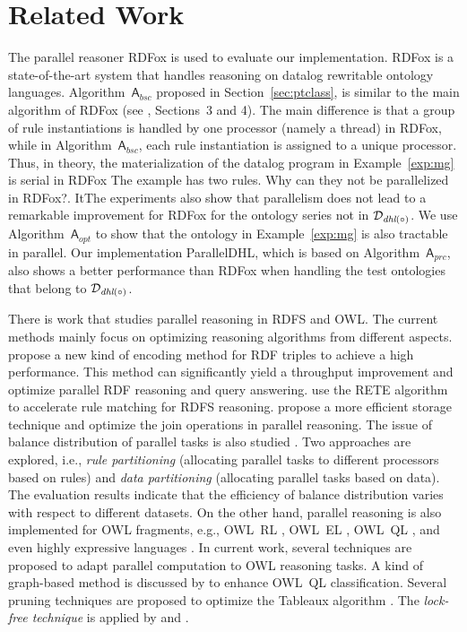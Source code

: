 \section{Related Work}
\label{sec:related}

The parallel reasoner RDFox \cite{MotikNPHO14} is used to evaluate our implementation. RDFox is a state-of-the-art system that handles reasoning on datalog rewritable ontology languages. Algorithm~$\mathsf{A}_{bsc}$ proposed in Section~\ref{sec:ptclass}, is similar to the main algorithm of RDFox (see \cite{MotikNPHO14}, Sections~3 and 4). The main difference is that a group of rule instantiations is handled by one processor (namely a thread) in RDFox, while in Algorithm~$\mathsf{A}_{bsc}$, each rule instantiation is assigned to a unique processor. Thus, in theory, the materialization of the datalog program in Example~\ref{exp:mg} is serial in RDFox {\color{red}The example has two rules. Why can they not be parallelized in RDFox?}. ItThe experiments also show that parallelism does not lead to a remarkable improvement for RDFox for the ontology series not in $\mathcal{D}_{\textit{\text{dhl}}(\circ)}$. We use Algorithm~$\mathsf{A}_{opt}$ to show that the ontology in Example~\ref{exp:mg} is also tractable in parallel. Our implementation ParallelDHL, which is based on Algorithm~$\mathsf{A}_{prc}$, also shows a better performance than RDFox when handling the test ontologies that belong to $\mathcal{D}_{\textit{\text{dhl}}(\circ)}$.

There is work that studies parallel reasoning in RDFS and OWL. The current methods mainly focus on optimizing reasoning algorithms from different aspects. \citet{GoodmanJMAAH11} propose a new kind of encoding method for RDF triples to achieve a high performance. This method can significantly yield a throughput improvement and optimize parallel RDF reasoning and query answering. \citet{PetersSZ15} use the RETE algorithm to accelerate rule matching for RDFS reasoning. \citet{SubercazeGCL16} propose a more efficient storage technique and optimize the join operations in parallel reasoning. The issue of balance distribution of parallel tasks is also studied \cite{SomaP08,WeaverH09}. Two approaches are explored, i.e., \emph{rule partitioning} (allocating parallel tasks to different processors based on rules) and \emph{data partitioning} (allocating parallel tasks based on data). The evaluation results indicate that the efficiency of balance distribution varies with respect to different datasets. On the other hand, parallel reasoning is also implemented for OWL fragments, e.g., OWL~RL \cite{KolovskiWE10}, OWL~EL \cite{KazakovKS14}, OWL~QL \cite{LemboSS13}, and even highly expressive languages \cite{SteigmillerLG14,LiebigM07,SchlichtS08,WuH12}. In current work, several techniques are proposed to adapt parallel computation to OWL reasoning tasks. A kind of graph-based method is discussed by \citet{LemboSS13} to enhance OWL~QL classification.  Several pruning techniques are proposed to optimize the Tableaux algorithm \cite{LiebigM07,SchlichtS08,WuH12}. The \emph{lock-free technique} is applied by \citet{KazakovKS14} and \citet{SteigmillerLG14}.

